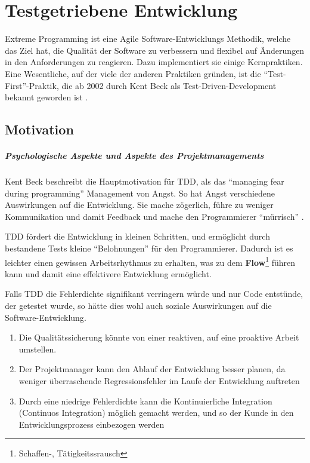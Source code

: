 \chapter{Testgetriebene Entwicklung}
\label{sec:tdd}

Extreme Programming ist eine Agile Software-Entwicklungs Methodik, welche das Ziel hat, die Qualität der Software zu verbessern und flexibel auf Änderungen in den Anforderungen zu reagieren. Dazu implementiert sie einige Kernpraktiken. Eine Wesentliche, auf der viele der anderen Praktiken gründen, ist die "`Test-First"'-Praktik, die ab 2002 durch Kent Beck als Test-Driven-Development bekannt geworden ist \citep{beck_test_2002}.


\section{Motivation}

  \paragraph{Psychologische Aspekte und Aspekte des Projektmanagements}

  Kent Beck beschreibt die Hauptmotivation für TDD, als das "`managing fear during programming"' Management von Angst. So hat Angst verschiedene Auswirkungen auf die Entwicklung. Sie mache zögerlich, führe zu weniger Kommunikation und damit Feedback und mache den Programmierer "`mürrisch"' \citep[S. xi]{beck_test_2002}.

  TDD fördert die Entwicklung in kleinen Schritten, und ermöglicht durch bestandene Tests kleine "`Belohnungen"' für den Programmierer. Dadurch ist es leichter einen gewissen Arbeitsrhythmus zu erhalten, was zu dem \textbf{Flow}\footnote{Schaffen-, Tätigkeitssrausch} führen kann\citep{roger_brown_test_2008} und damit eine effektivere Entwicklung ermöglicht.

  Falls TDD die Fehlerdichte signifikant verringern würde und nur Code entstünde, der getestet wurde, so hätte dies wohl auch soziale Auswirkungen auf die Software-Entwicklung\citep[S. x]{beck_test_2002}.
  \begin{enumerate}
   \item Die Qualitätssicherung könnte von einer reaktiven, auf eine proaktive Arbeit umstellen.
   \item Der Projektmanager kann den Ablauf der Entwicklung besser planen, da weniger überraschende Regressionsfehler im Laufe der Entwicklung auftreten
   \item Durch eine niedrige Fehlerdichte kann die Kontinuierliche Integration (Continuos Integration) möglich gemacht werden, und so der Kunde in den Entwicklungsprozess einbezogen werden
  \end{enumerate}



